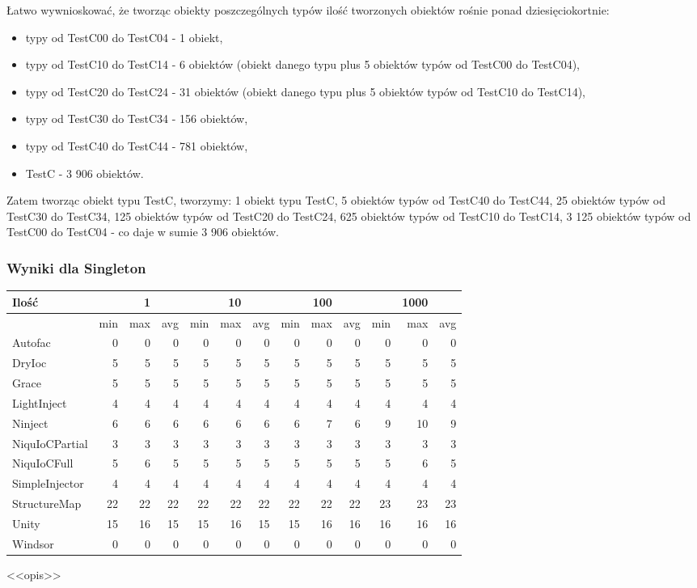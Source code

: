 \documentclass[12pt]{article}
\begin{document}
Łatwo wywnioskować, że tworząc obiekty poszczególnych typów ilość tworzonych obiektów rośnie ponad dziesięciokortnie:
\begin{itemize}
	\item typy od TestC00 do TestC04 - 1 obiekt,
	\item typy od TestC10 do TestC14 - 6 obiektów (obiekt danego typu plus 5 obiektów typów od TestC00 do TestC04),
	\item typy od TestC20 do TestC24 - 31 obiektów (obiekt danego typu plus 5 obiektów typów od TestC10 do TestC14),
	\item typy od TestC30 do TestC34 - 156 obiektów,
	\item  typy od TestC40 do TestC44 - 781 obiektów,
	\item TestC - 3 906 obiektów.
\end{itemize}
Zatem tworząc obiekt typu TestC, tworzymy: 1 obiekt typu TestC, 5 obiektów typów od TestC40 do TestC44, 25 obiektów typów od TestC30 do TestC34, 125 obiektów typów od TestC20 do TestC24, 625 obiektów typów od TestC10 do TestC14, 3 125 obiektów typów od TestC00 do TestC04 - co daje w sumie 3 906 obiektów.

\subsubsection{Wyniki dla Singleton}
\begin{center}
\begin{small}
	\begin{tabular}{ | l | r r r | r r r | r r r | r r r | }
    		\hline
     		Ilość & & 1 & & & 10 & & & 100 & & & 1000 & \\ \hline
     		 & min & max & avg & min & max & avg & min & max & avg & min & max & avg \\ \hline
    		Autofac & 0 & 0 & 0 & 0 & 0 & 0 & 0 & 0 & 0 & 0 & 0 & 0 \\ \hline
		DryIoc & 5 & 5 & 5 & 5 & 5 & 5 & 5 & 5 & 5 & 5 & 5 & 5 \\ \hline
		Grace & 5 & 5 & 5 & 5 & 5 & 5 & 5 & 5 & 5 & 5 & 5 & 5 \\ \hline
		LightInject & 4 & 4 & 4 & 4 & 4 & 4 & 4 & 4 & 4 & 4 & 4 & 4 \\ \hline
		Ninject & 6 & 6 & 6 & 6 & 6 & 6 & 6 & 7 & 6 & 9 & 10 & 9 \\ \hline
		NiquIoCPartial & 3 & 3 & 3 & 3 & 3 & 3 & 3 & 3 & 3 & 3 & 3 & 3 \\ \hline
		NiquIoCFull & 5 & 6 & 5 & 5 & 5 & 5 & 5 & 5 & 5 & 5 & 6 & 5 \\ \hline
		SimpleInjector & 4 & 4 & 4 & 4 & 4 & 4 & 4 & 4 & 4 & 4 & 4 & 4 \\ \hline
		StructureMap & 22 & 22 & 22 & 22 & 22 & 22 & 22 & 22 & 22 & 23 & 23 & 23 \\ \hline
		Unity & 15 & 16 & 15 & 15 & 16 & 15 & 15 & 16 & 16 & 16 & 16 & 16 \\ \hline
		Windsor & 0 & 0 & 0 & 0 & 0 & 0 & 0 & 0 & 0 & 0 & 0 & 0 \\
    		\hline
  	\end{tabular}
\end{small}
\end{center}
<<opis>>
\end{document}
